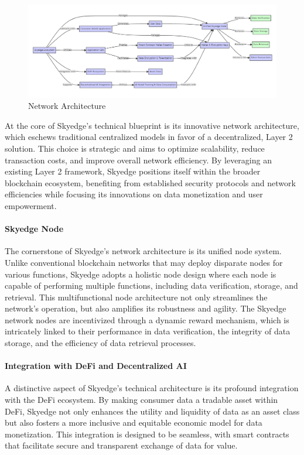 \documentclass{article}
\begin{document}
\begin{figure}[h]
    \centering
    \includegraphics[width=1\linewidth]{skyedge-01.png}
    \caption{Network Architecture}
    \label{fig:network-architecturel}
\end{figure}

At the core of Skyedge's technical blueprint is its innovative network architecture, which eschews traditional centralized models in favor of a decentralized, Layer 2 solution. This choice is strategic and aims to optimize scalability, reduce transaction costs, and improve overall network efficiency. By leveraging an existing Layer 2 framework, Skyedge positions itself within the broader blockchain ecosystem, benefiting from established security protocols and network efficiencies while focusing its innovations on data monetization and user empowerment.

\paragraph{Skyedge Node} The cornerstone of Skyedge's network architecture is its unified node system. Unlike conventional blockchain networks that may deploy disparate nodes for various functions, Skyedge adopts a holistic node design where each node is capable of performing multiple functions, including data verification, storage, and retrieval. This multifunctional node architecture not only streamlines the network's operation, but also amplifies its robustness and agility. The Skyedge network nodes are incentivized through a dynamic reward mechanism, which is intricately linked to their performance in data verification, the integrity of data storage, and the efficiency of data retrieval processes.

\paragraph{Integration with DeFi and Decentralized AI}
A distinctive aspect of Skyedge's technical architecture is its profound integration with the DeFi ecosystem. By making consumer data a tradable asset within DeFi, Skyedge not only enhances the utility and liquidity of data as an asset class but also fosters a more inclusive and equitable economic model for data monetization. This integration is designed to be seamless, with smart contracts that facilitate secure and transparent exchange of data for value.
\end{document}
